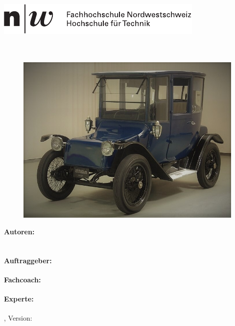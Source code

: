 \thispagestyle{plain}

\begin{titlepage}
	\begin{flushleft}
	\hspace{-1cm} \includegraphics{images/fhnw_logo_full}\\
		\textbf{
			\hspace{-0.12cm}\LARGE{\doctype}\\
			\Huge{\titel}\\
			\vspace{0.5cm}
			\large{\untertitel}
		}
		
		\begin{figure}[h]
			\centering
				\includegraphics[width=.90\textwidth]{images/Anfang.JPG}
			\label{fig:Anfang}
		\end{figure}
		
		\vfill
		\large{	

			\vspace{0.5cm}
			\textbf{Autoren:}\\ \autorA\\ \autorB \\
			\vspace{0.5cm}
			\textbf{Auftraggeber:}\\ \dozent \\
			\vspace{0.5cm}
			\textbf{Fachcoach:}\\ \betreuer \\
			\vspace{0.5cm}
			\textbf{Experte:}\\ \experte \\
			\vspace{0.5cm}
			\ort, \datum \hfill Version: \version
			\\
		}
	\end{flushleft}
\end{titlepage}
